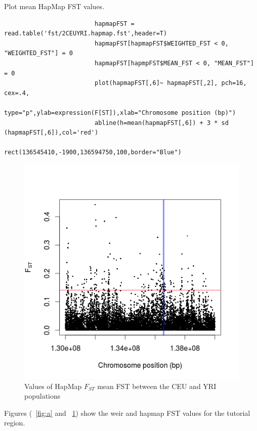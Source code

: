 \documentclass[a4paper,10pt]{article}
\begin{document}
                         \noindent
                         Plot mean HapMap FST values.\\
                         \begin{verbatim}
                         hapmapFST = read.table('fst/2CEUYRI.hapmap.fst',header=T) 
                         hapmapFST[hapmapFST$WEIGHTED_FST < 0, "WEIGHTED_FST"] = 0
                         hapmapFST[hapmpFST$MEAN_FST < 0, "MEAN_FST"] = 0
                         plot(hapmapFST[,6]~ hapmapFST[,2], pch=16, cex=.4, 
                         type="p",ylab=expression(F[ST]),xlab="Chromosome position (bp)") 
                         abline(h=mean(hapmapFST[,6]) + 3 * sd (hapmapFST[,6]),col='red')
                         rect(136545410,-1900,136594750,100,border="Blue") 
                         \end{verbatim}
                         \begin{figure}
                         \centering
                         \includegraphics{pictures/hapmapCEUYRI.png}
                         \caption{Values of HapMap $F_{ST}$ mean FST between the CEU and YRI populations}
                         \label{fig:hapmapfst}
                         \end{figure}

                         \noindent 
                         Figures (~\ref{fig:a} and ~\ref{fig:hapmapfst}) show the weir and hapmap FST values for the tutorial region.
\end{document}
